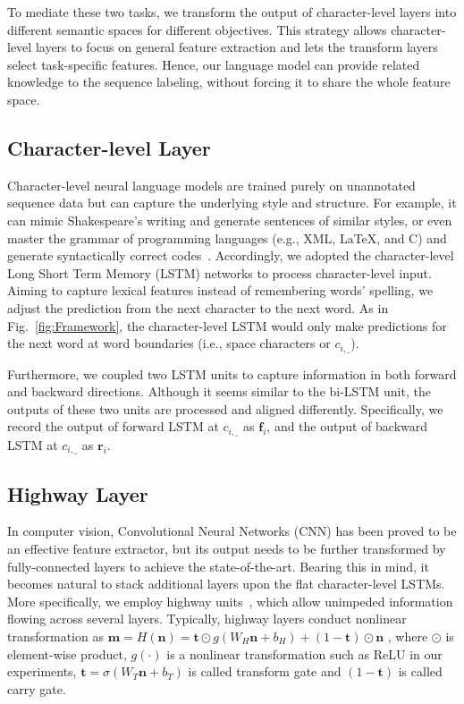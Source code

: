 \documentclass[letterpaper]{article} \usepackage{aaai18}  \usepackage{times}  \usepackage{helvet}  \usepackage{courier}  \usepackage{url}  \usepackage{graphicx}  \usepackage{multirow}
\def \myspace {\_}
\def \f {\mathbf{f}}
\def \m {\mathbf{m}}
\def \n {\mathbf{n}}
\def \r {\mathbf{r}}
\def \t {\mathbf{t}}
\begin{document}
To mediate these two tasks, we transform the output of character-level layers into different semantic spaces 
for different objectives.
This strategy allows character-level layers to focus on general feature extraction and lets the transform layers select task-specific features.
Hence, our language model can provide related knowledge to the sequence labeling, without forcing it to share the whole feature space.

\subsection{Character-level Layer}

Character-level neural language models are trained purely on unannotated sequence data but can capture the underlying style and structure.
For example, it can mimic Shakespeare's writing and generate sentences of similar styles, or even master the grammar of programming languages (e.g., XML, \LaTeX, and C) and generate syntactically correct codes~\cite{rnn-effectiveness-blog}.
Accordingly, we adopted the character-level Long Short Term Memory (LSTM) networks to process character-level input.
Aiming to capture lexical features instead of remembering words' spelling,
we adjust the prediction from the next character to the next word.
As in Fig.~\ref{fig:Framework}, the character-level LSTM would only make predictions for the next word at word boundaries (i.e., space characters or $c_{i, \myspace}$).

Furthermore, we coupled two LSTM units to capture information in both forward and backward directions.
Although it seems similar to the bi-LSTM unit, the outputs of these two units are processed and aligned differently.
Specifically, we record the output of forward LSTM at $c_{i, \myspace}$ as $\f_{i}$, and the output of backward LSTM at $c_{i, \myspace}$ as $\r_{i}$.

\subsection{Highway Layer}

In computer vision, Convolutional Neural Networks (CNN) has been proved to be an effective feature extractor, but its output needs to be further transformed by fully-connected layers to achieve the state-of-the-art.
Bearing this in mind, it becomes natural to stack additional layers upon the flat character-level LSTMs.
More specifically, we employ highway units~\cite{srivastava2015highway}, which allow unimpeded information flowing across several layers.
Typically, highway layers conduct nonlinear transformation as
$
\m = H(\n) = \t \odot g(W_H \n + b_H) + (1-\t) \odot \n
$
, where $\odot$ is element-wise product, $g(\cdot)$ is a nonlinear transformation such as ReLU in our experiments, $\t=\sigma(W_T \n + b_T)$ is called transform gate and $(1-\t)$ is called carry gate.
\end{document}
